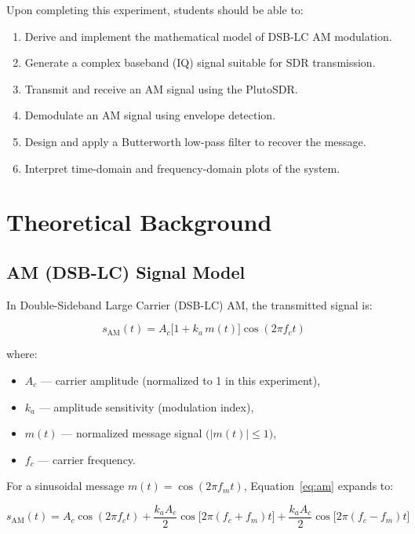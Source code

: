 \documentclass[12pt,a4paper]{article}
\begin{document}
Upon completing this experiment, students should be able to:
\begin{enumerate}[label=\arabic*.]
  \item Derive and implement the mathematical model of DSB-LC AM modulation.
  \item Generate a complex baseband (IQ) signal suitable for SDR transmission.
  \item Transmit and receive an AM signal using the PlutoSDR.
  \item Demodulate an AM signal using envelope detection.
  \item Design and apply a Butterworth low-pass filter to recover the message.
  \item Interpret time-domain and frequency-domain plots of the system.
\end{enumerate}

\section{Theoretical Background}

\subsection{AM (DSB-LC) Signal Model}

In Double-Sideband Large Carrier (DSB-LC) AM, the transmitted signal is:

\begin{equation}
  s_{\mathrm{AM}}(t) = A_c\bigl[1 + k_a\, m(t)\bigr]\cos(2\pi f_c t)
  \label{eq:am}
\end{equation}

\noindent where:
\begin{itemize}
  \item $A_c$ — carrier amplitude (normalized to 1 in this experiment),
  \item $k_a$ — amplitude sensitivity (modulation index),
  \item $m(t)$ — normalized message signal $\bigl(|m(t)|\le 1\bigr)$,
  \item $f_c$ — carrier frequency.
\end{itemize}

For a sinusoidal message $m(t) = \cos(2\pi f_m t)$, Equation~\ref{eq:am}
expands to:

\begin{equation}
  s_{\mathrm{AM}}(t) = A_c\cos(2\pi f_c t)
    + \frac{k_a A_c}{2}\cos\bigl[2\pi(f_c+f_m)t\bigr]
    + \frac{k_a A_c}{2}\cos\bigl[2\pi(f_c-f_m)t\bigr]
\end{equation}
\end{document}

